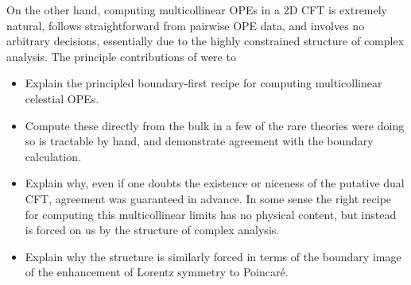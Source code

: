 \documentclass[11pt,letterpaper]{article}
\begin{document}
On the other hand, computing multicollinear OPEs in a 2D CFT is extremely natural, follows straightforward from pairwise OPE data, and involves no arbitrary decisions, essentially due to the highly constrained structure of complex analysis. The principle contributions of \cite{Calkins:2026hpg} were to \begin{itemize}
    \item Explain the principled boundary-first recipe for computing multicollinear celestial OPEs.
    \item Compute these directly from the bulk in a few of the rare theories were doing so is tractable by hand, and demonstrate agreement with the boundary calculation.
    \item Explain why, even if one doubts the existence or niceness of the putative dual CFT, agreement was guaranteed in advance. In some sense the right recipe for computing this multicollinear limits has no physical content, but instead is forced on us by the structure of complex analysis.
    \item Explain why the structure is similarly forced in terms of the boundary image of the enhancement of Lorentz symmetry to Poincar\'{e}.
\end{itemize}
\end{document}
